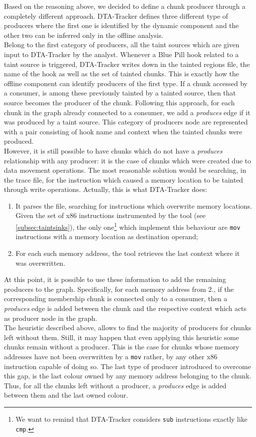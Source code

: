 \documentclass[LaM,binding=0.6cm]{sapthesis}
\begin{document}
Based on the reasoning above, we decided to define a chunk producer through a completely different approach. DTA-Tracker defines three different type of producers where the first one is identified by the dynamic component and the other two can be inferred only in the offline analysis.\\
Belong to the first category of producers, all the taint sources which are given input to DTA-Tracker by the analyst. Whenever a Blue Pill hook related to a taint source is triggered, DTA-Tracker writes down in the tainted regions file, the name of the hook as well as the set of tainted chunks. This is exactly how the offline component can identify producers of the first type. If a chunk accessed by a consumer, is among these previously tainted by a tainted source, then that source becomes the producer of the chunk. Following this approach, for each chunk in the graph already connected to a consumer, we add a \textit{produces} edge if it was produced by a taint source. This category of producers node are represented with a pair consisting of hook name and context when the tainted chunks were produced.\\

However, it is still possible to have chunks which do not have a \textit{produces} relationship with any producer: it is the case of chunks which were created due to data movement operations. The most reasonable solution would be searching, in the trace file, for the instruction which caused a memory location to be tainted through write operations. Actually, this is what DTA-Tracker does:
\begin{enumerate}
\item It parses the file, searching for instructions which overwrite memory locations. Given the set of x$86$ instructions instrumented by the tool (see \autoref{subsec:taintsinks}), the only one\footnote{We want to remind that DTA-Tracker considers \texttt{sub} instructions exactly like \texttt{cmp}.} which implement this behaviour are \texttt{mov} instructions with a memory location as destination operand;
\item For each such memory address, the tool retrieves the last context where it was overwritten. 
\end{enumerate}
At this point, it is possible to use these information to add the remaining producers to the graph. Specifically, for each memory address from $2.$, if the corresponding membership chunk is connected only to a consumer, then a \textit{produces} edge is added between the chunk and the respective context which acts as producer node in the graph.\\
The heuristic described above, allows to find the majority of producers for chunks left without them. Still, it may happen that even applying this heuristic some chunks remain without a producer. This is the case for chunks whose memory addresses have not been overwritten by a \texttt{mov} rather, by any other x$86$ instruction capable of doing so. The last type of producer introduced to overcome this gap, is the last colour owned by any memory address belonging to the chunk. Thus, for all the chunks left without a producer, a \textit{produces} edge is added between them and the last owned colour.
\end{document}
